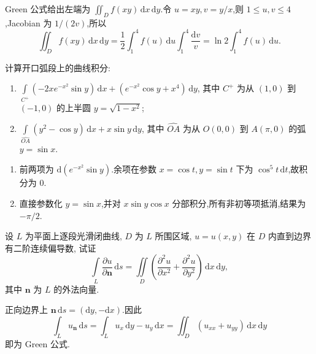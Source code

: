 \begin{solution}
    Green 公式给出左端为 $\iint_Df(xy)\,\mathrm{d}x\,\mathrm{d}y$.令 $u=xy,v=y/x$,则 $1\leq u,v\leq4$,Jacobian 为 $1/(2v)$,所以
    \[
        \iint_Df(xy)\,\mathrm{d}x\,\mathrm{d}y
        =\dfrac{1}{2}\int_1^4f(u)\,\mathrm{d}u\int_1^4\dfrac{\mathrm{d}v}{v}
        =\ln2\int_1^4f(u)\,\mathrm{d}u.
    \]
\end{solution}

\begin{example}
    计算开口弧段上的曲线积分:
    \begin{enumerate}
        \item $\displaystyle\int\limits_{C^+}(-2xe^{-x^2}\sin y)\,\mathrm{d}x+(e^{-x^2}\cos y+x^4)\,\mathrm{d}y$, 其中 $C^+$ 为从 $(1,0)$ 到 $(-1,0)$ 的上半圆 $y=\sqrt{1-x^2}$;
        \item $\displaystyle\int\limits_{\widehat{OA}}(y^2-\cos y)\,\mathrm{d}x+x\sin y\,\mathrm{d}y$, 其中 $\widehat{OA}$ 为从 $O(0,0)$ 到 $A(\pi,0)$ 的弧 $y=\sin x$.
    \end{enumerate}
\end{example}
\exampleblank

\begin{solution}
    \begin{enumerate}
        \item 前两项为 $\mathrm{d}(e^{-x^2}\sin y)$.余项在参数 $x=\cos t,y=\sin t$ 下为 $\cos^5t\,\mathrm{d}t$,故积分为 $0$.
        \item 直接参数化 $y=\sin x$,并对 $x\sin y\cos x$ 分部积分,所有非初等项抵消,结果为 $-\pi/2$.
    \end{enumerate}
\end{solution}

\begin{example}
    设 $L$ 为平面上逐段光滑闭曲线, $D$ 为 $L$ 所围区域, $u=u(x,y)$ 在 $D$ 内直到边界有二阶连续偏导数, 试证
    \[
        \int\limits_L\dfrac{\partial u}{\partial\bm n}\,\mathrm{d}s
        =\iint\limits_D\left(\dfrac{\partial^2u}{\partial x^2}+\dfrac{\partial^2u}{\partial y^2}\right)\,\mathrm{d}x\,\mathrm{d}y,
    \]
    其中 $\bm n$ 为 $L$ 的外法向量.
\end{example}
\exampleblank

\begin{solution}
    正向边界上 $\bm n\,\mathrm{d}s=(\mathrm{d}y,-\mathrm{d}x)$.因此
    \[
        \int_Lu_{\bm n}\,\mathrm{d}s=\int_Lu_x\,\mathrm{d}y-u_y\,\mathrm{d}x
        =\iint_D(u_{xx}+u_{yy})\,\mathrm{d}x\,\mathrm{d}y
    \]
    即为 Green 公式.
\end{solution}



